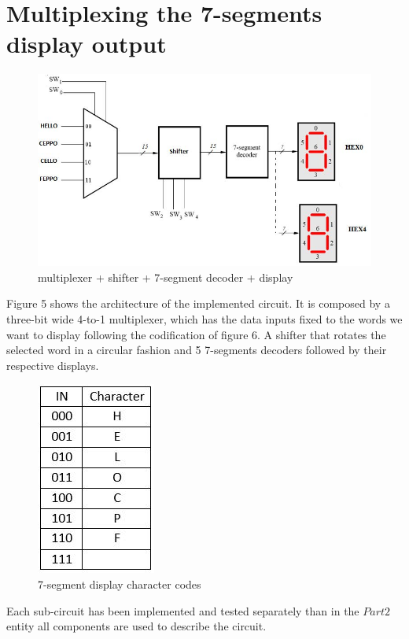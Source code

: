 \documentclass[12pt]{article}
\begin{document}
\section{ Multiplexing the 7-segments display output}
\begin{figure}[h]
	\centering
	\includegraphics[scale = 0.7]{Berchialla_PuntoB/image1.jpg}
	\caption{multiplexer + shifter + 7-segment decoder + display}
\end{figure}
	Figure 5 shows the architecture of the implemented circuit. It is composed by a three-bit wide 4-to-1 multiplexer, which has the data inputs fixed to the words we want to display following the codification of figure 6. A shifter that rotates the selected word in a circular fashion and 5 7-segments decoders followed by their respective displays.


\begin{figure}[h]
	\centering
	\includegraphics[scale = 0.4]{Berchialla_PuntoB/image2.jpg}
	\caption{7-segment display character codes}
\end{figure}

Each sub-circuit has been implemented and tested separately than in the $Part2$ entity all components are used to describe the circuit.
\end{document}
